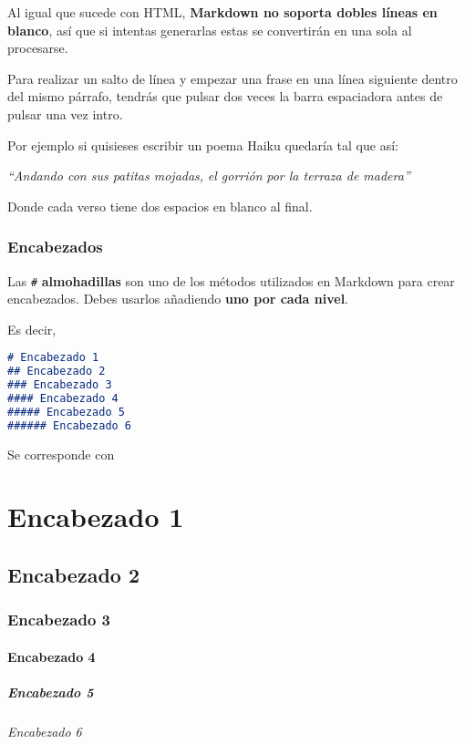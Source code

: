 Al igual que sucede con HTML, \textbf{Markdown no soporta dobles líneas en blanco}, así que si intentas generarlas estas se convertirán en una sola al procesarse.

Para realizar un salto de línea y empezar una frase en una línea siguiente dentro del mismo párrafo, tendrás que pulsar dos veces la barra espaciadora antes de pulsar una vez intro.

Por ejemplo si quisieses escribir un poema Haiku quedaría tal que así:

\emph{“Andando con sus patitas mojadas,}  
\emph{el gorrión}  
\emph{por la terraza de madera”}  

Donde cada verso tiene dos espacios en blanco al final.

\section{Encabezados}

Las \lstinline{#} \textbf{almohadillas} son uno de los métodos utilizados en Markdown para crear encabezados. Debes usarlos añadiendo \textbf{uno por cada nivel}.

Es decir,

\begin{lstlisting}[language= markdown]
# Encabezado 1
## Encabezado 2
### Encabezado 3
#### Encabezado 4
##### Encabezado 5
###### Encabezado 6
\end{lstlisting}

Se corresponde con

\part{Encabezado 1}
\chapter{Encabezado 2}
\section{Encabezado 3}
\subsection{Encabezado 4}
\subsubsection{Encabezado 5}
\paragraph{Encabezado 6}

